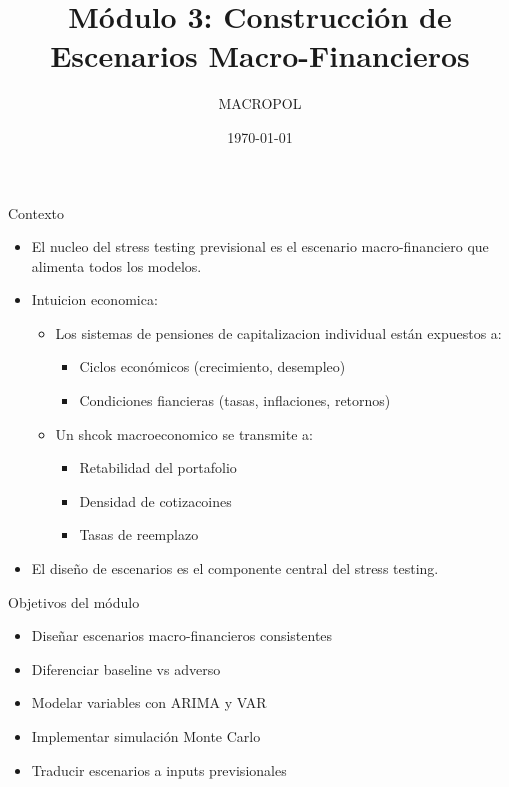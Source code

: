 \documentclass{beamer}
\title{Módulo 3: Construcción de Escenarios Macro-Financieros}
\author{MACROPOL}
\date{\today}
\begin{document}
\frame{\titlepage}

\begin{frame}{Contexto}
\begin{itemize}
    \item El nucleo del stress testing previsional es el escenario macro-financiero que alimenta todos los modelos.
    \item Intuicion economica:
    \begin{itemize}
        \item Los sistemas de pensiones de capitalizacion individual est\'an expuestos a:
        \begin{itemize}
            \item Ciclos econ\'omicos (crecimiento, desempleo)
            \item Condiciones fiancieras (tasas, inflaciones, retornos)
        \end{itemize}
        \item Un shcok macroeconomico se transmite a:
        \begin{itemize}
            \item Retabilidad del portafolio
            \item Densidad de cotizacoines
            \item Tasas de reemplazo
        \end{itemize}
    \end{itemize}
    \item El diseño de escenarios es el componente central del stress testing.
\end{itemize}
    
\end{frame}

\begin{frame}{Objetivos del módulo}
\begin{itemize}
\item Diseñar escenarios macro-financieros consistentes
\item Diferenciar baseline vs adverso
\item Modelar variables con ARIMA y VAR
\item Implementar simulación Monte Carlo
\item Traducir escenarios a inputs previsionales
\end{itemize}
\end{frame}
\end{document}
